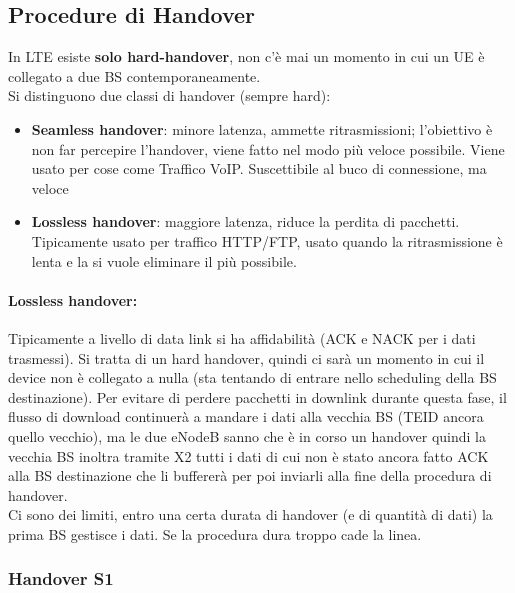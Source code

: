 \subsection{Procedure di Handover}

In LTE esiste \textbf{solo hard-handover}, non c'è mai un momento in cui un UE è collegato a due BS contemporaneamente.\\

Si distinguono due classi di handover (sempre hard):
\begin{itemize}
	\item \textbf{Seamless handover}: minore latenza, ammette ritrasmissioni; l'obiettivo è non far percepire l'handover, viene fatto nel modo più veloce possibile. Viene usato per cose come Traffico VoIP. Suscettibile al buco di connessione, ma veloce
	\item \textbf{Lossless handover}: maggiore latenza, riduce la perdita di pacchetti. Tipicamente usato per traffico HTTP/FTP, usato quando la ritrasmissione è lenta e la si vuole eliminare il più possibile.
\end{itemize}

\paragraph{Lossless handover:} Tipicamente a livello di data link si ha affidabilità (ACK e NACK per i dati trasmessi). Si tratta di un hard handover, quindi ci sarà un momento in cui il device non è collegato a nulla (sta tentando di entrare nello scheduling della BS destinazione). Per evitare di perdere pacchetti in downlink durante questa fase, il flusso di download continuerà a mandare i dati alla vecchia BS (TEID ancora quello vecchio), ma le due eNodeB sanno che è in corso un handover quindi la vecchia BS inoltra tramite X2 tutti i dati di cui non è stato ancora fatto ACK alla BS destinazione che li buffererà per poi inviarli alla fine della procedura di handover. \\

Ci sono dei limiti, entro una certa durata di handover (e di quantità di dati) la prima BS gestisce i dati. Se la procedura dura troppo cade la linea.\\

\newpage

\subsubsection{Handover S1}

